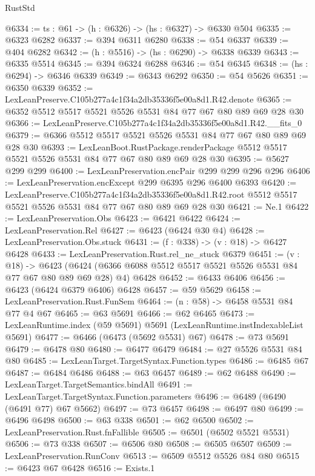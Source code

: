 \begin{lexlean}{RustStd}
\begin{coremodule}
@6334 := {ts : @61} -> (h : @6326) -> (hs : @6327) -> @6330 @504
@6335 := @6323 @6282
@6337 := @394 @6311 @6280
@6338 := @54 @6337
@6339 := @404 @6282
@6342 := (h : @5516) -> (hs : @6290) -> @6338 @6339
@6343 := @6335 @5514
@6345 := @394 @6324 @6288
@6346 := @54 @6345
@6348 := (hs : @6294) -> @6346 @6339
@6349 := @6343 @6292
@6350 := @54 @5626
@6351 := @6350 @6339
@6352 := LexLeanPreserve.C105b277a4c1f34a2db35336f5e00a8d1.R42.denote
@6365 := @6352 @5512 @5517 @5521 @5526 @5531 @84 @77 @67 @80 @89 @69 @28 @30
@6366 := LexLeanPreserve.C105b277a4c1f34a2db35336f5e00a8d1.R42.__fits_0
@6379 := @6366 @5512 @5517 @5521 @5526 @5531 @84 @77 @67 @80 @89 @69 @28 @30
@6393 := LexLeanBoot.RustPackage.renderPackage
    @5512
    @5517
    @5521
    @5526
    @5531
    @84
    @77
    @67
    @80
    @89
    @69
    @28
    @30
@6395 := @5627 @299 @299
@6400 := LexLeanPreservation.encPair @299 @299 @296 @296
@6406 := LexLeanPreservation.encExcept @299 @6395 @296 @6400 @6393
@6420 := LexLeanPreserve.C105b277a4c1f34a2db35336f5e00a8d1.R42.root
    @5512
    @5517
    @5521
    @5526
    @5531
    @84
    @77
    @67
    @80
    @89
    @69
    @28
    @30
@6421 := Ne.{1}
@6422 := LexLeanPreservation.Obs
@6423 := @6421 @6422
@6424 := LexLeanPreservation.Rel
@6427 := @6423 (@6424 @30 @4)
@6428 := LexLeanPreservation.Obs.stuck
@6431 := (f : @338) -> (v : @18) -> @6427 @6428
@6433 := LexLeanPreservation.Rust.rel_ne_stuck @6379
@6451 := (v : @18) ->
  @6423 (@6424 (@6366 @6088 @5512 @5517 @5521 @5526 @5531 @84 @77 @67 @80 @89 @69 @28) @4) @6428
@6452 := @6433 @6406
@6456 := @6423 (@6424 @6379 @6406) @6428
@6457 := @59 @5629
@6458 := LexLeanPreservation.Rust.FunSem
@6464 := (n : @58) -> @6458 @5531 @84 @77 @4 @67
@6465 := @63 @5691
@6466 := @62 @6465
@6473 := LexLeanRuntime.index (@59 @5691) @5691 (LexLeanRuntime.instIndexableList @5691)
@6477 := @6466 (@6473 (@5692 @5531) @67)
@6478 := @73 @5691
@6479 := @6478 @80
@6480 := @6477 @6479
@6484 := @27 @5526 @5531 @84 @80
@6485 := LexLeanTarget.TargetSyntax.Function.types
@6486 := @6485 @67
@6487 := @6484 @6486
@6488 := @63 @6457
@6489 := @62 @6488
@6490 := LexLeanTarget.TargetSemantics.bindAll
@6491 := LexLeanTarget.TargetSyntax.Function.parameters
@6496 := @6489 (@6490 (@6491 @77) @67 @5662)
@6497 := @73 @6457
@6498 := @6497 @80
@6499 := @6496 @6498
@6500 := @63 @338
@6501 := @62 @6500
@6502 := LexLeanPreservation.Rust.fnFallible
@6505 := @6501 (@6502 @5521 @5531)
@6506 := @73 @338
@6507 := @6506 @80
@6508 := @6505 @6507
@6509 := LexLeanPreservation.RunConv
@6513 := @6509 @5512 @5526 @84 @80
@6515 := @6423 @67 @6428
@6516 := Exists.{1}

\end{coremodule}
\end{lexlean}
